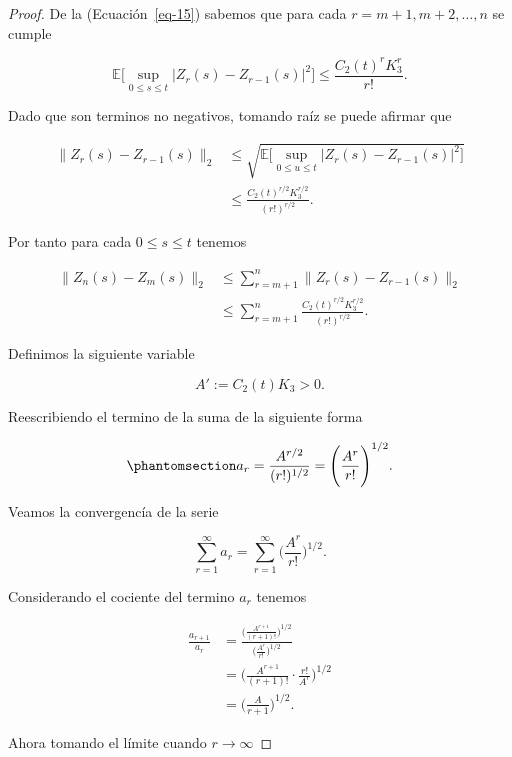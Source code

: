 \documentclass[
  spanish,
  us-letterpaper,
]{scrreprt}
\theoremstyle{plain}
\theoremstyle{plain}
\theoremstyle{plain}
\theoremstyle{definition}
\theoremstyle{remark}
\begin{document}
\begin{proof}
De la (Ecuación~\ref{eq-15}) sabemos que para cada
\(r=m+1,m+2,\ldots,n\) se cumple

\[
    \mathbb{E}\Bigg[\sup\limits_{0\leq s\leq t}|Z_r(s)-Z_{r-1}(s)|^2\Bigg]\leq \frac{C_2(t)^rK_3^r}{r!}.
\]

Dado que son terminos no negativos, tomando raíz se puede afirmar que

\[
    \begin{aligned}
        \|Z_r(s)-Z_{r-1}(s)\|_2 & \leq \sqrt{\mathbb{E}\Bigg[\sup\limits_{0\leq u\leq t}|Z_r(s)-Z_{r-1}(s)|^2\Bigg]}\\ 
        & \leq \frac{C_2(t)^{r/2}K_3^{r/2}}{(r!)^{r/2}}.
    \end{aligned}
\]

Por tanto para cada \(0\leq s\leq t\) tenemos

\[
    \begin{aligned}
        \|Z_n(s)-Z_m(s)\|_2 & \leq \sum\limits_{r=m+1}^n \|Z_r(s)-Z_{r-1}(s)\|_2\\ 
        & \leq \sum\limits_{r=m+1}^n \frac{C_2(t)^{r/2}K_3^{r/2}}{(r!)^{r/2}}.
    \end{aligned}
\]

Definimos la siguiente variable

\[
    A':=C_2(t)K_3>0.
\]

Reescribiendo el termino de la suma de la siguiente forma

\begin{equation}\phantomsection\label{eq-16}{
    a_r=\frac{A^{r/2}}{(r!)^{1/2}}=\Bigg(\frac{A^r}{r!}\Bigg)^{1/2}.
}\end{equation}

Veamos la convergencía de la serie

\[
\sum\limits_{r=1}^{\infty} a_r=\sum\limits_{r=1}^{\infty} \Bigg(\frac{A^r}{r!}\Bigg)^{1/2}.
\]

Considerando el cociente del termino \(a_r\) tenemos

\[
    \begin{aligned}
        \frac{a_{r+1}}{a_r} & = \frac{\Bigg(\frac{A^{r+1}}{(r+1)!}\Bigg)^{1/2}}{\Bigg(\frac{A^r}{r!}\Bigg)^{1/2}}\\ 
        & = \Bigg(\frac{A^{r+1}}{(r+1)!}\cdot \frac{r!}{A^r}\Bigg)^{1/2}\\ 
        & = \Bigg(\frac{A}{r+1}\Bigg)^{1/2}.
    \end{aligned}
\]

Ahora tomando el límite cuando \(r\rightarrow\infty\)


\end{proof}
\end{document}
